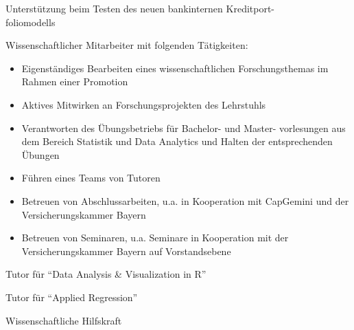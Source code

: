 \documentclass[10pt,a4paper,withhyper]{altacv}
\begin{document}
\begin{paracol}{2}
\divider

Unterstützung beim Testen des neuen bankinternen Kreditport-\\foliomodells



\newpage


Wissenschaftlicher Mitarbeiter mit folgenden Tätigkeiten:
\smallskip
\begin{itemize}
\item Eigenständiges Bearbeiten eines wissenschaftlichen Forschungsthemas im Rahmen einer Promotion
\item Aktives Mitwirken an Forschungsprojekten des Lehrstuhls
\item Verantworten des Übungsbetriebs für Bachelor- und Master- vorlesungen aus dem Bereich Statistik und Data Analytics und Halten der entsprechenden Übungen
\item Führen eines Teams von Tutoren
\item Betreuen von Abschlussarbeiten, u.a. in Kooperation mit CapGemini und der Versicherungskammer Bayern
\item Betreuen von Seminaren, u.a. Seminare in Kooperation mit der Versicherungskammer Bayern auf Vorstandsebene
\end{itemize}

\divider

Tutor für ``Data Analysis \& Visualization in R''

\divider

Tutor für ``Applied Regression''

\divider

Wissenschaftliche Hilfskraft

\divider


\end{paracol}
\end{document}
